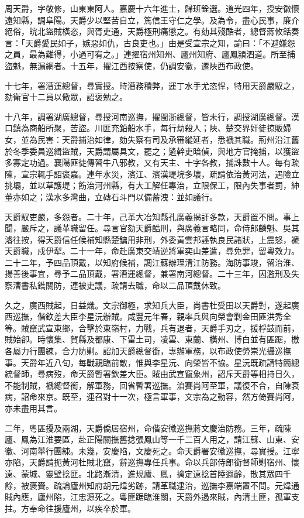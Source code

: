 \begin{pinyinscope}
周天爵，字敬修，山東東阿人。嘉慶十六年進士，歸班銓選。道光四年，授安徽懷遠知縣，調阜陽。天爵少以堅苦自立，篤信王守仁之學。及為令，盡心民事，廉介絕俗，皖北盜賊橫恣，與胥吏通，天爵極刑痛懲之。有劾其殘酷者，總督蔣攸銛奏言：「天爵愛民如子，嫉惡如仇，古良吏也。」由是受宣宗之知，諭曰：「不避嫌怨之員，最為難得，小過可宥之。」連擢宿州知州、廬州知府、廬鳳潁泗道。所至捕盜魁，無漏網者。十五年，擢江西按察使，仍調安徽，遷陜西布政使。

十七年，署漕運總督，尋實授。時漕務積弊，運丁水手尤恣悍，特用天爵嚴馭之，劾衛官十二員以儆眾，詔褒勉之。

十八年，調署湖廣總督，尋授河南巡撫，擢閩浙總督，皆未行，調授湖廣總督。漢口鎮為商船所聚，苦盜。川匪充鉛船水手，每行劫殺人；陜、楚交界奸徒掠販婦女，並為民害：天爵捕治如律，劾失察有司及承審縱延者，悉褫其職。荊州沿江舊於冬季委員巡緝盜賊，天爵謂屬具文，罷之；遴幹吏暗偵，與地方官掩捕，以獲盜多寡定功過。襄陽匪徒傳習牛八邪教，又有天主、十字各教，捕誅數十人。每有疏陳，宣宗輒手詔褒嘉。連年水災，濱江、濱漢堤垸多壞，疏請依治黃河法，遇險立挑壩，並以草護堤；飭治河州縣，有大工解任專治，立限保工，限內失事者罰，紳董亦如之；漢水多灣曲，立磚石斗門以備蓄洩：並如議行。

天爵馭吏嚴，多怨者。二十年，己革大冶知縣孔廣義揭訐多款，天爵置不問。事上聞，嚴斥之，議革職留任。尋言官劾天爵酷刑，與廣義言略同，命侍郎麟魁、吳其濬往按，得天爵信任候補知縣楚鏞用非刑，外委黃雲邦誣執良民諸狀，上震怒，褫天爵職，戍伊犁。二十一年，命赴廣東交靖逆將軍奕山差遣，尋免罪，留粵效力。二十二年，予四品頂戴，以知府候補，調江蘇辦理清江防務。海防事竣，留治淮、揚善後事宜，尋予二品頂戴，署漕運總督，兼署南河總督。二十三年，因濫刑及失察漕書私鐫關防，連被吏議，疏請去職，命以二品頂戴休致。

久之，廣西賊起，日益熾。文宗御極，求知兵大臣，尚書杜受田以天爵對，遂起廣西巡撫，偕欽差大臣李星沅辦賊。咸豐元年春，親率兵與向榮會剿金田匪洪秀全等。賊竄武宣東鄉，合擊於東嶺村，力戰，兵有退者，天爵手刃之，援桴鼓而前，賊始卻。時懷集、賀縣及都康、下雷土司，凌雲、東蘭、橫州、博白並有匪踞，檄各屬力行團練，合力防剿。詔加天爵總督銜，專辦軍務，以布政使勞崇光攝巡撫事。天爵年近八旬，每戰親臨前敵，惟與李星沅、向榮皆不協。星沅既疏請特簡總統督師，尋病歿，命天爵暫署欽差大臣。賊由武宣竄象州，詔斥天爵等相持日久，不能制賊，褫總督銜，解軍務，回省暫署巡撫。洎賽尚阿至軍，議復不合，自陳衰病，詔命來京。既至，連召對十一次，極言軍事，文宗為之動容，然方倚賽尚阿，亦未盡用其言。

二年，粵匪擾及兩湖，天爵僑居宿州，命偕安徽巡撫蔣文慶治防務。三年，疏陳廬、鳳為江淮要區，赴正陽關撫舊捻張鳳山等一千二百人用之，請江蘇、山東、安徽、河南舉行團練。未幾，安慶陷，文慶死之。命天爵署安徽巡撫，尋實授。江寧亦陷，天爵請扼黃河杜賊北竄，辭巡撫專任兵事。命以兵部侍郎銜督師剿宿州、懷遠、蒙城、靈壁捻匪。北路漸清，進規廬、鳳，擒定遠捻首陸遐齡，散其眾四千餘，被褒賚。疏論廬州知府胡元煒劣跡，請革職逮治，巡撫李嘉端置不問。元煒通賊內應，廬州陷，江忠源死之。粵匪踞臨淮關，天爵外遏來賊，內清土匪，孤軍支拄。方奉命往援廬州，以疾卒於軍。


\end{pinyinscope}
